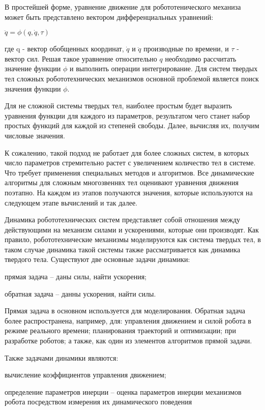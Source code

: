 \documentclass[a4paper,14pt]{extreport}
\begin{document}
В простейшей форме, уравнение движение для робототенического механиза 
может быть представлено вектором дифференциальных уравнений:


\begin{center}
$\ddot q = \phi(q, \dot q, \tau)$	
\end{center}
 


где q - вектор обобщенных координат, $\dot q$ и $\ddot q$ производные по времени, и $\tau$ - вектор сил. Решая такое уравнение относительно $q$ необходимо рассчитать значение функции $\phi$ и выполнить операции интегрирование. Для систем твердых тел сложных робототехнических механизмов основной проблемой является поиск значения функции $\phi$.


Для не сложной системы твердых тел, наиболее простым будет выразить уравнения функции для каждого из параметров, результатом чего станет набор простых функций для каждой из степеней свободы. Далее, вычисляя их, получим числовые значения.


К сожалению, такой подход не работает для более сложных систем, в которых число параметров стремительно растет с увеличением количество тел в системе. Что требует применения специальных методов и алгоритмов.
Все динамические алгоритмы для сложным многозвеннвх тел оценивают уравнения движения поэтапно. На каждом из этапов получаются значения, которые используются на следующем этапе вычислений и так далее.


Динамика робототехнических систем представляет собой отношения между действующими на механизм силами и ускорениями, которые они  производят. Как правило, робототехнические механизмы моделируются как система твердых тел, в таком случае динамика такой системы также рассматривается как динамика твердого тела. 
Существуют две основные задачи динамики:

прямая задача -- даны силы, найти ускорения;

обратная задача -- данны ускорения, найти силы.

Прямая задача в основном используется для моделирования. Обратная задача более распространена, например, для: управления движением и силой робота в режиме реального времени; планирования траекторий и оптимизации; при разработке роботов; а также, как один из элементов алгоритмов прямой задачи.


Также задачами динамики являются:

вычисление коэффициентов управления движением;

определение параметров инерции -- оценка параметров инерции механизмов робота посредством измерения их динамического поведения
\end{document}
